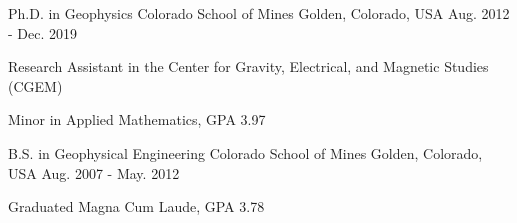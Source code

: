 

\begin{cventries}

 \cventry
    {Ph.D. in Geophysics} %
    {Colorado School of Mines} %
    {Golden, Colorado, USA} %
    {Aug. 2012 - Dec. 2019} %
    {
      \begin{cvitems} %
       \item{Research Assistant in the Center for Gravity, Electrical, and Magnetic Studies (CGEM)}
        \item {Minor in Applied Mathematics, GPA 3.97}
      \end{cvitems}
    }
 \cventry
    {B.S. in Geophysical Engineering} %
    {Colorado School of Mines} %
    {Golden, Colorado, USA} %
    {Aug. 2007 - May. 2012} %
    {
      \begin{cvitems} %
        \item {Graduated Magna Cum Laude, GPA 3.78}
      \end{cvitems}
    }



\end{cventries}
